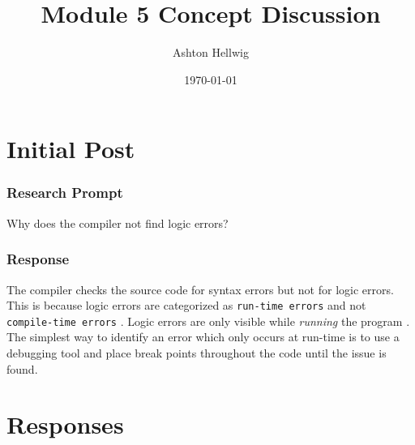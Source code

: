 \documentclass[12pt]{article}
\title{Module 5 Concept Discussion}
\author{Ashton Hellwig}
\date{\today}
\theoremstyle{definition}
\theoremstyle{plain}
\begin{document}
  \maketitle
  \tableofcontents
  \lstlistoflistings
  \newpage


  \part{Initial Post}

    \section{Research Prompt}
      \begin{mdframed}
        Why does the compiler not find logic errors?
      \end{mdframed}

    \section{Response}
      The compiler checks the source code for syntax errors but not for logic
        errors. This is because logic errors are categorized as
        \texttt{run-time errors} and not \texttt{compile-time errors}
        \cite{pitts_2000}. Logic errors are only visible while
        \textit{running} the program \cite[Chapter 4]{malik_2015}. The simplest
        way to identify an error which only occurs at run-time is to use a
        debugging tool and place break points throughout the code until the issue
        is found.


  \newpage
  \part{Responses}
\end{document}
